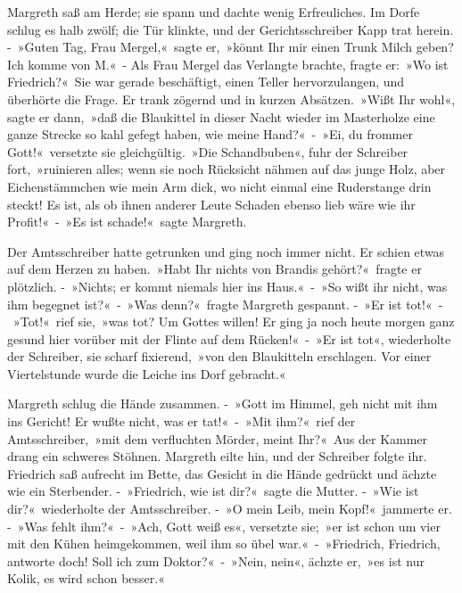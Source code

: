 Margreth saß am Herde; sie spann und dachte wenig Erfreuliches. Im Dorfe schlug es halb zwölf; die Tür klinkte, und der Gerichtsschreiber Kapp trat herein. - »Guten Tag, Frau Mergel,« sagte er, »könnt Ihr mir einen Trunk Milch geben? Ich komme von M.« - Als Frau Mergel das Verlangte brachte, fragte er: »Wo ist Friedrich?« Sie war gerade beschäftigt, einen Teller hervorzulangen, und überhörte die Frage. Er trank zögernd und in kurzen Absätzen. »Wißt Ihr wohl«, sagte er dann, »daß die Blaukittel in dieser Nacht wieder im Masterholze eine ganze Strecke so kahl gefegt haben, wie meine Hand?« - »Ei, du frommer Gott!« versetzte sie gleichgültig. »Die Schandbuben«, fuhr der Schreiber fort, »ruinieren alles; wenn sie noch Rücksicht nähmen auf das junge Holz, aber Eichenstämmchen wie mein Arm dick, wo nicht einmal eine Ruderstange drin steckt! Es ist, als ob ihnen anderer Leute Schaden ebenso lieb wäre wie ihr Profit!« - »Es ist schade!« sagte Margreth.

Der Amtsschreiber hatte getrunken und ging noch immer nicht. Er schien etwas auf dem Herzen zu haben. »Habt Ihr nichts von Brandis gehört?« fragte er plötzlich. - »Nichts; er kommt niemals hier ins Haus.« - »So wißt ihr nicht, was ihm begegnet ist?« - »Was denn?« fragte Margreth gespannt. - »Er ist tot!« - »Tot!« rief sie, »was tot? Um Gottes willen! Er ging ja noch heute morgen ganz gesund hier vorüber mit der Flinte auf dem Rücken!« - »Er ist tot«, wiederholte der Schreiber, sie scharf fixierend, »von den Blaukitteln erschlagen. Vor einer Viertelstunde wurde die Leiche ins Dorf gebracht.«

Margreth schlug die Hände zusammen. - »Gott im Himmel, geh nicht mit ihm ins Gericht! Er wußte nicht, was er tat!« - »Mit ihm?« rief der Amtsschreiber, »mit dem verfluchten Mörder, meint Ihr?« Aus der Kammer drang ein schweres Stöhnen. Margreth eilte hin, und der Schreiber folgte ihr. Friedrich saß aufrecht im Bette, das Gesicht in die Hände gedrückt und ächzte wie ein Sterbender. - »Friedrich, wie ist dir?« sagte die Mutter. - »Wie ist dir?« wiederholte der Amtsschreiber. - »O mein Leib, mein Kopf!« jammerte er. - »Was fehlt ihm?« - »Ach, Gott weiß es«, versetzte sie; »er ist schon um vier mit den Kühen heimgekommen, weil ihm so übel war.« - »Friedrich, Friedrich, antworte doch! Soll ich zum Doktor?« - »Nein, nein«, ächzte er, »es ist nur Kolik, es wird schon besser.«

